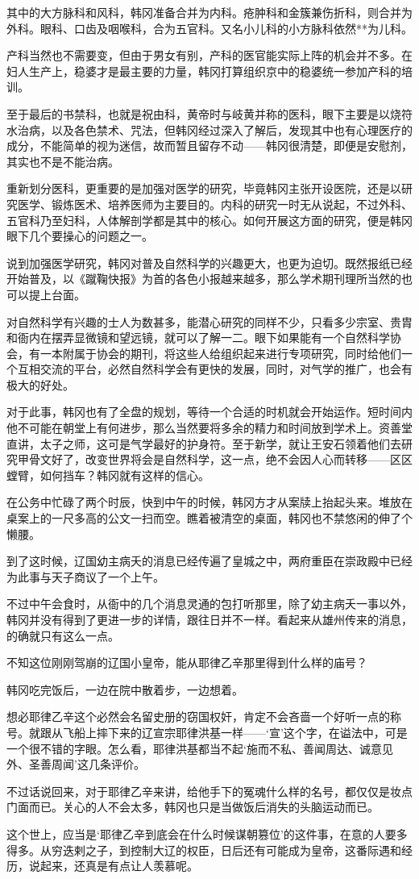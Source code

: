 其中的大方脉科和风科，韩冈准备合并为内科。疮肿科和金簇兼伤折科，则合并为外科。眼科、口齿及咽喉科，合为五官科。又名小儿科的小方脉科依然**为儿科。 

产科当然也不需要变，但由于男女有别，产科的医官能实际上阵的机会并不多。在妇人生产上，稳婆才是最主要的力量，韩冈打算组织京中的稳婆统一参加产科的培训。 

至于最后的书禁科，也就是祝由科，黄帝时与岐黄并称的医科，眼下主要是以烧符水治病，以及各色禁术、咒法，但韩冈经过深入了解后，发现其中也有心理医疗的成分，不能简单的视为迷信，故而暂且留存不动——韩冈很清楚，即便是安慰剂，其实也不是不能治病。 

重新划分医科，更重要的是加强对医学的研究，毕竟韩冈主张开设医院，还是以研究医学、锻炼医术、培养医师为主要目的。内科的研究一时无从说起，不过外科、五官科乃至妇科，人体解剖学都是其中的核心。如何开展这方面的研究，便是韩冈眼下几个要操心的问题之一。 

说到加强医学研究，韩冈对普及自然科学的兴趣更大，也更为迫切。既然报纸已经开始普及，以《蹴鞠快报》为首的各色小报越来越多，那么学术期刊理所当然的也可以提上台面。 

对自然科学有兴趣的士人为数甚多，能潜心研究的同样不少，只看多少宗室、贵胄和衙内在摆弄显微镜和望远镜，就可以了解一二。眼下如果能有一个自然科学协会，有一本附属于协会的期刊，将这些人给组织起来进行专项研究，同时给他们一个互相交流的平台，必然自然科学会有更快的发展，同时，对气学的推广，也会有极大的好处。 

对于此事，韩冈也有了全盘的规划，等待一个合适的时机就会开始运作。短时间内他不可能在朝堂上有何进步，那么当然要将多余的精力和时间放到学术上。资善堂直讲，太子之师，这可是气学最好的护身符。至于新学，就让王安石领着他们去研究甲骨文好了，改变世界将会是自然科学，这一点，绝不会因人心而转移——区区螳臂，如何挡车？韩冈就有这样的信心。 

在公务中忙碌了两个时辰，快到中午的时候，韩冈方才从案牍上抬起头来。堆放在桌案上的一尺多高的公文一扫而空。瞧着被清空的桌面，韩冈也不禁悠闲的伸了个懒腰。 

到了这时候，辽国幼主病夭的消息已经传遍了皇城之中，两府重臣在崇政殿中已经为此事与天子商议了一个上午。 

不过中午会食时，从衙中的几个消息灵通的包打听那里，除了幼主病夭一事以外，韩冈并没有得到了更进一步的详情，跟往日并不一样。看起来从雄州传来的消息，的确就只有这么一点。 

不知这位刚刚驾崩的辽国小皇帝，能从耶律乙辛那里得到什么样的庙号？ 

韩冈吃完饭后，一边在院中散着步，一边想着。 

想必耶律乙辛这个必然会名留史册的窃国权奸，肯定不会吝啬一个好听一点的称号。就跟从飞船上摔下来的辽宣宗耶律洪基一样——‘宣’这个字，在谥法中，可是一个很不错的字眼。怎么看，耶律洪基都当不起‘施而不私、善闻周达、诚意见外、圣善周闻’这几条评价。 

不过话说回来，对于耶律乙辛来讲，给他手下的冤魂什么样的名号，都仅仅是妆点门面而已。关心的人不会太多，韩冈也只是当做饭后消失的头脑运动而已。 

这个世上，应当是‘耶律乙辛到底会在什么时候谋朝篡位’的这件事，在意的人要多得多。从穷迭剌之子，到控制大辽的权臣，日后还有可能成为皇帝，这番际遇和经历，说起来，还真是有点让人羡慕呢。 

